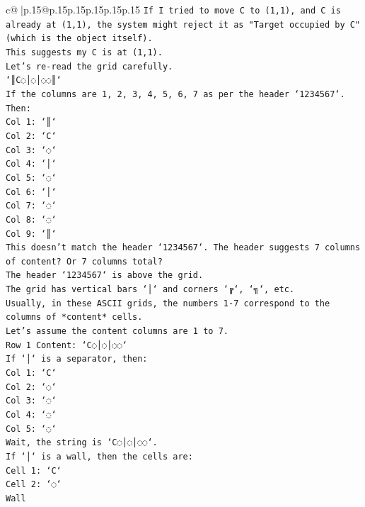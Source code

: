 \documentclass{article}
\begin{document}
{\begin{supertabular}{c@{$\;$}|p{.15\linewidth}@{}p{.15\linewidth}p{.15\linewidth}p{.15\linewidth}p{.15\linewidth}p{.15\linewidth}}
{{{\texttt{If I tried to move C to (1,1), and C is already at (1,1), the system might reject it as "Target occupied by C" (which is the object itself).} \\
\texttt{This suggests my C is at (1,1).} \\
\texttt{Let's re{-}read the grid carefully.} \\
\texttt{`║C◌│◌│◌◌║`} \\
\texttt{If the columns are 1, 2, 3, 4, 5, 6, 7 as per the header `1234567`.} \\
\texttt{Then:} \\
\texttt{Col 1: `║`} \\
\texttt{Col 2: `C`} \\
\texttt{Col 3: `◌`} \\
\texttt{Col 4: `│`} \\
\texttt{Col 5: `◌`} \\
\texttt{Col 6: `│`} \\
\texttt{Col 7: `◌`} \\
\texttt{Col 8: `◌`} \\
\texttt{Col 9: `║`} \\
\texttt{This doesn't match the header `1234567`. The header suggests 7 columns of content? Or 7 columns total?} \\
\texttt{The header `1234567` is above the grid.} \\
\texttt{The grid has vertical bars `│` and corners `╔`, `╗`, etc.} \\
\texttt{Usually, in these ASCII grids, the numbers 1{-}7 correspond to the columns of *content* cells.} \\
\texttt{Let's assume the content columns are 1 to 7.} \\
\texttt{Row 1 Content: `C◌│◌│◌◌`} \\
\texttt{If `│` is a separator, then:} \\
\texttt{Col 1: `C`} \\
\texttt{Col 2: `◌`} \\
\texttt{Col 3: `◌`} \\
\texttt{Col 4: `◌`} \\
\texttt{Col 5: `◌`} \\
\texttt{Wait, the string is `C◌│◌│◌◌`.} \\
\texttt{If `│` is a wall, then the cells are:} \\
\texttt{Cell 1: `C`} \\
\texttt{Cell 2: `◌`} \\
\texttt{Wall} \\
}}}
\end{supertabular}}
\end{document}
